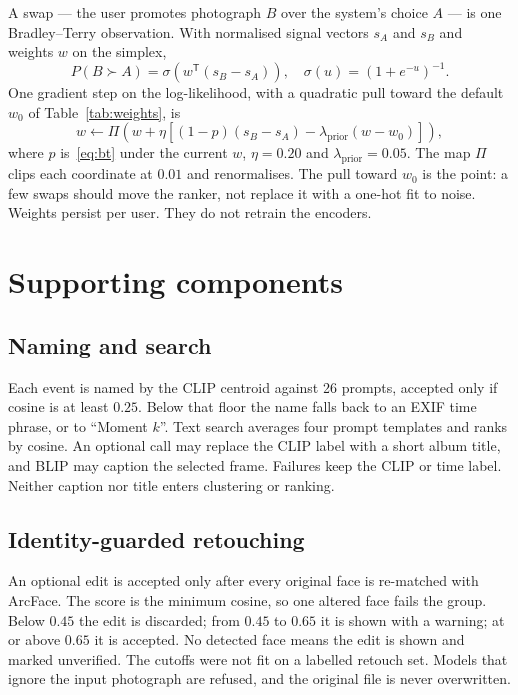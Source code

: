 \documentclass[conference]{IEEEtran}
\begin{document}
A swap --- the user promotes photograph $B$ over the system's choice $A$ ---
is one Bradley--Terry observation. With normalised signal vectors $s_A$ and
$s_B$ and weights $w$ on the simplex,
\begin{equation}
P(B \succ A) = \sigma\!\left(w^{\mathsf T}(s_B-s_A)\right),
\quad
\sigma(u)=(1+e^{-u})^{-1}.
\label{eq:bt}
\end{equation}
One gradient step on the log-likelihood, with a quadratic pull toward the
default $w_0$ of Table~\ref{tab:weights}, is
\begin{equation}
w
\leftarrow
\Pi\!\left(
w + \eta\left[
(1-p)(s_B-s_A)
-
\lambda_{\mathrm{prior}}(w-w_0)
\right]
\right),
\label{eq:sgd}
\end{equation}
where $p$ is~\eqref{eq:bt} under the current $w$, $\eta=0.20$ and
$\lambda_{\mathrm{prior}}=0.05$. The map $\Pi$ clips each coordinate at $0.01$
and renormalises. The pull toward $w_0$ is the point: a few swaps should move
the ranker, not replace it with a one-hot fit to noise. Weights persist per
user. They do not retrain the encoders.

\section{Supporting components}
\label{sec:support}

\subsection{Naming and search}
\label{sec:clip}

Each event is named by the CLIP centroid against 26 prompts, accepted only if
cosine is at least $0.25$. Below that floor the name falls back to an EXIF
time phrase, or to ``Moment $k$''. Text search averages four prompt templates
and ranks by cosine. An optional call may replace the CLIP label with a short
album title, and BLIP may caption the selected frame. Failures keep the CLIP
or time label. Neither caption nor title enters clustering or ranking.

\subsection{Identity-guarded retouching}
\label{sec:enhance}

An optional edit is accepted only after every original face is re-matched with
ArcFace. The score is the minimum cosine, so one altered face fails the group.
Below $0.45$ the edit is discarded; from $0.45$ to $0.65$ it is shown with a
warning; at or above $0.65$ it is accepted. No detected face means the edit is
shown and marked unverified. The cutoffs were not fit on a labelled retouch
set. Models that ignore the input photograph are refused, and the original
file is never overwritten.
\end{document}

